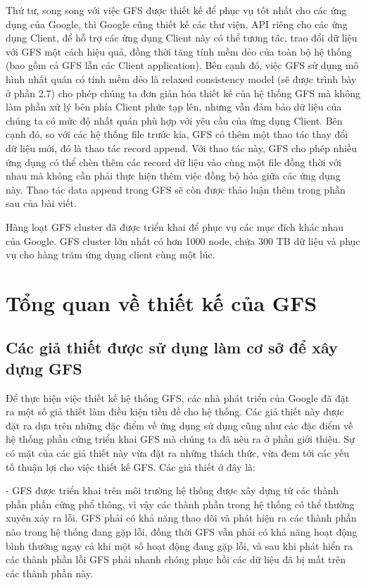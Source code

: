 \documentclass[a4paper, 10pt, conference]{IEEEconf}
\begin{document}
Thứ tư, song song với việc GFS được thiết kế để phục vụ tốt nhất cho các ứng dụng của Google, thì Google cũng thiết kế các thư viện, API riêng cho các ứng dụng Client, để hỗ trợ các ứng dụng Client này có thể tương tác, trao đổi dữ liệu với GFS một cách hiệu quả, đồng thời tăng tính mềm dẻo của toàn bộ hệ thống (bao gồm cả GFS lẫn các Client application). Bên cạnh đó, việc GFS sử dụng mô hình nhất quán có tính mềm dẻo là relaxed consistency model (sẽ được trình bày ở phần 2.7) cho phép chúng ta đơn giản hóa thiết kế của hệ thống GFS mà không làm phần xử lý bên phía Client phức tạp lên, nhưng vẫn đảm bảo dữ liệu của chúng ta có mức độ nhất quán phù hợp với yêu cầu của ứng dụng Client. Bên cạnh đó, so với các hệ thống file trước kia, GFS có thêm một thao tác thay đổi dữ liệu mới, đó là thao tác record append. Với thao tác này, GFS cho phép nhiều ứng dụng có thể chèn thêm các record dữ liệu vào cùng một file đồng thời với nhau mà không cần phải thực hiện thêm việc đồng bộ hóa giữa các ứng dụng này. Thao tác data append trong GFS sẽ còn được thảo luận thêm trong phần sau của bài viết.

Hàng loạt GFS cluster đã được triển khai để phục vụ các mục đích khác nhau của Google. GFS cluster lớn nhất có hơn 1000 node, chứa 300 TB dữ liệu và phục vụ cho hàng trăm ứng dụng client cùng một lúc.


\section{Tổng quan về thiết kế của GFS}

\subsection{Các giả thiết được sử dụng làm cơ sở để xây dựng GFS}

Để thực hiện việc thiết kế hệ thống GFS, các nhà phát triển của Google đã đặt ra một số giả thiết làm điều kiện tiền đề cho hệ thống. Các giả thiết này được đặt ra dựa trên những đặc điểm về ứng dụng sử dụng cũng như các đặc điểm về hệ thống phần cứng triển khai GFS mà chúng ta đã nêu ra ở phần giới thiệu. Sự có mặt của các giả thiết này vừa đặt ra những thách thức, vừa đem tới các yếu tố thuận lợi cho việc thiết kế GFS. Các giả thiết ở đây là:

- GFS được triển khai trên môi trường hệ thống được xây dựng từ các thành phần phần cứng phổ thông, vì vậy các thành phần trong hệ thống có thể thường xuyên xảy ra lỗi. GFS phải có khả năng thao dõi và phát hiện ra các thành phần nào trong hệ thống đang gặp lỗi, đồng thời GFS vẫn phải có khả năng hoạt động bình thường ngay cả khi một số hoạt động đang gặp lỗi, và sau khi phát hiển ra các thành phần lỗi GFS phải nhanh chóng phục hồi các dữ liệu đã bị mất trên các thành phần này.
\end{document}
